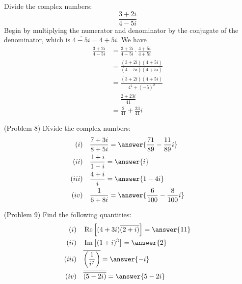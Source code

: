 \documentclass[handout]{ximera}
\begin{document}
\begin{example}[Example 8]
Divide the complex numbers:
\[
\frac{3+2i}{4-5i} 
\]
Begin by multiplying the numerator and denominator by the conjugate of the denominator, 
which is $\overline {4-5i} = 4+5i$.
We have
\begin{align*}
\frac{3+2i}{4-5i} &= \frac{3+2i}{4-5i} \cdot \frac{4+5i}{4+5i} \\[9 pt]
                  &= \frac{(3+2i)(4+5i)}{(4-5i)(4+5i)}\\[9pt]
									&= \frac{(3+2i)(4+5i)}{4^2 +(-5)^2}\\[8pt]
                  &= \frac{2+23i}{41}\\[7pt]
                  &= \frac{2}{41} + \frac{23}{41}i
\end{align*}
\end{example}


\begin{problem}(Problem 8)
Divide the complex numbers:
\begin{align*}
(i)& \quad  \frac{7+3i}{8+5i} = \answer{\frac{71}{89} -\frac{11}{89}i}\\
(ii)& \quad\frac{1+i}{1-i} = \answer{i}\\
(iii)& \quad\frac{4+i}{i} = \answer{1-4i}\\
(iv)& \quad\frac{1}{6+8i} = \answer{\frac{6}{100} - \frac{8}{100}i}
\end{align*}
\end{problem}


\begin{problem}(Problem 9)
Find the following quantities:
\begin{align*}
(i)& \quad \Rep\left[(4+3i)\overline{(2+i)}\right] = \answer{11}\\
(ii)& \quad \Imp\left[(1+i)^3\right] = \answer{2}\\
(iii)& \quad \overline{\left(\frac{1}{i^7}\right)} = \answer{-i}\\
(iv)& \quad \overline{\overline{(5-2i)}} = \answer{5-2i}
\end{align*}
\end{problem}
\end{document}
